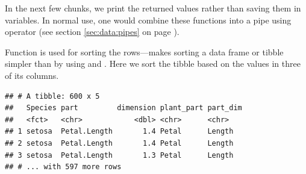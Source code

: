 \documentclass[krantz2]{krantz}\usepackage{knitr}
\begin{document}
\begin{knitrout}\footnotesize
{}\color{fgcolor}
\end{knitrout}

In the next few chunks, we print the returned values rather than saving them in variables. In normal use, one would combine these functions into a pipe using operator  (see section \ref{sec:data:pipes} on page \pageref{sec:data:pipes}).

Function  is used for sorting the rows---makes sorting a data frame or tibble simpler than by using  and . Here we sort the tibble  based on the values in three of its columns.

\begin{knitrout}\footnotesize
{}\color{fgcolor}\begin{kframe}
\begin{alltt}
\end{alltt}
\begin{verbatim}
## # A tibble: 600 x 5
##   Species part         dimension plant_part part_dim
##   <fct>   <chr>            <dbl> <chr>      <chr>   
## 1 setosa  Petal.Length       1.4 Petal      Length  
## 2 setosa  Petal.Length       1.4 Petal      Length  
## 3 setosa  Petal.Length       1.3 Petal      Length  
## # ... with 597 more rows
\end{verbatim}
\end{kframe}
\end{knitrout}
\end{document}
